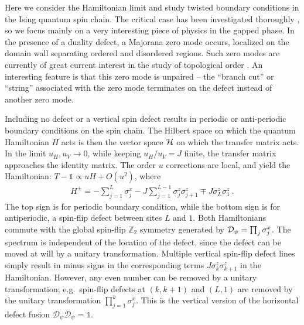 \documentclass[11pt]{article}
\newcommand{\D}{{\mathcal{D}}}
\numberwithin{equation}{section}		%
\begin{document}
Here we consider the Hamiltonian limit and study twisted boundary conditions in the Ising quantum spin chain. 
The critical case has been investigated thoroughly \cite{Schutz1993, Affleck1997,Grimm2002}, so we focus mainly on a very interesting piece of physics in the gapped phase. In the presence of a duality defect, a Majorana zero mode occurs, localized on the domain wall separating ordered and disordered regions. Such zero modes are currently of great current interest in the study of topological order \cite{Aliceareview}. An interesting feature is that this zero mode is unpaired -- the ``branch cut'' or ``string'' associated with the zero mode terminates on the defect instead of another zero mode. 


Including no defect or a vertical spin defect results in periodic or anti-periodic boundary conditions on the spin chain. The Hilbert space on which the quantum Hamiltonian $H$ acts is then the vector space ${\cal H}$ on which the transfer matrix acts.  In the limit $u_H,u_V\to 0$, while keeping $u_H/u_V=J$ finite, the transfer matrix approaches the identity matrix. The order $u$ corrections are local, and yield the Hamiltonian: $T-\mathds{1} \propto u H + O(u^2)$, where
\begin{align}
H^{\pm} = -\sum_{j=1}^L \sigma^x_j - J \sum_{j=1}^{L-1}\sigma_j^z \sigma_{j+1}^z 
\mp J\sigma^z_L\sigma^z_{1}\ .
\label{HamiltonianLimit}
\end{align}
The top sign is for periodic boundary condition, while the bottom sign is for antiperiodic, a spin-flip defect between sites $L$ and $1$. 
Both Hamiltonians commute with the global spin-flip $\mathbb{Z}_2$ symmetry generated by ${\cal D}_\psi=\prod_j \sigma_j^x$.
The spectrum is independent of the location of the defect, since the defect can be moved at will by a unitary transformation. Multiple vertical spin-flip defect lines simply result in minus signs in the corresponding terms $J\sigma^z_k\sigma^z_{k+1}$ in the Hamiltonian. However, any even number can be removed by a unitary transformation; e.g.\ spin-flip defects at $(k,k+1)$ and $(L,1)$ are removed by the unitary transformation $\prod_{j=1}^k\sigma^x_j$. This is the vertical version of the horizontal defect fusion $\D_\psi\D_\psi =\mathds{1}$.
\end{document}
